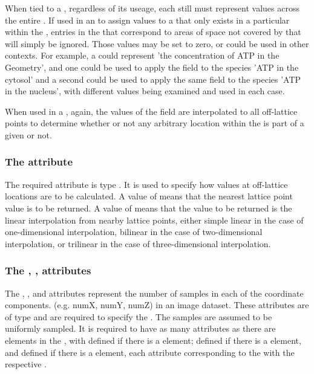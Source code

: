 When tied to a \SpatialSymbolReference, regardless of its useage, each \SampledField still must represent values across the entire \Geometry.  If used in an \InitialAssignment to assign values to a \Species that only exists in a particular \DomainType within the \Geometry, entries in the \SampledField that correspond to areas of space not covered by that \DomainType will simply be ignored.  Those values may be set to zero, or could be used in other contexts.  For example, a \SampledField could represent 'the concentration of ATP in the Geometry', and one \InitialAssignment could be used to apply the field to the species 'ATP in the cytosol' and a second \InitialAssignment could be used to apply the same field to the species 'ATP in the nucleus', with different values being examined and used in each case.

When used in a \SampledFieldGeometry, again, the values of the field are interpolated to all off-lattice points to determine whether or not any arbitrary location within the \Geometry is part of a given \SampledVolume or not.

\subsubsection{The \fixttspace{} attribute}
The required  attribute is type . It is used to specify how values at off-lattice locations are to be calculated.  A value of  means that the nearest lattice point value is to be returned.  A value of  means that the value to be returned is the linear interpolation from nearby lattice points, either simple linear in the case of one-dimensional interpolation, bilinear in the case of two-dimensional interpolation, or trilinear in the case of three-dimensional interpolation.


\subsubsection{The \fixttspace{}, ,  attributes}
The , , and  attributes represent the number of samples in each of the coordinate components. (e.g. numX, numY, numZ) in an image dataset.  These attributes are of type  and are required to specify the \SampledField. The samples are assumed to be uniformly sampled.  It is required to have as many  attributes as there are \CoordinateComponent elements in the \Geometry, with  defined if there is a  element;  defined if there is a  element, and  defined if there is a  element, each attribute corresponding to the \CoordinateComponent with the respective .

